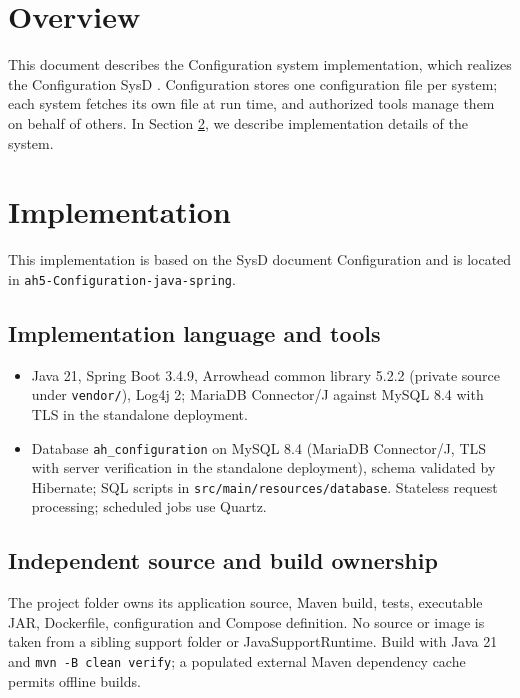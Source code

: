 \documentclass[a4paper]{arrowhead}
\begin{document}
\section{Overview}
\label{sec:overview}

This document describes the Configuration system implementation, which realizes the Configuration SysD \cite{cfg-sysd}. Configuration stores one configuration file per system; each system fetches its own file at run time, and authorized tools manage them on behalf of others.
In Section \ref{Implementation}, we describe implementation details of the system.

\newpage

\section{Implementation}
\label{Implementation}

This implementation is based on the SysD document Configuration \cite{cfg-sysd} and is located in \texttt{ah5-Configuration-java-spring}.

\subsection{Implementation language and tools}
\begin{itemize}
\item Java 21, Spring Boot 3.4.9, Arrowhead common library 5.2.2 (private source under \texttt{vendor/}), Log4j 2; MariaDB Connector/J against MySQL 8.4 with TLS in the standalone deployment.
\item Database \texttt{ah\_\allowbreak{}configuration} on MySQL 8.4 (MariaDB Connector/J, TLS with server verification in the standalone deployment), schema validated by Hibernate; SQL scripts in \texttt{src/\allowbreak{}main/\allowbreak{}resources/\allowbreak{}database}. Stateless request processing; scheduled jobs use Quartz.
\end{itemize}

\subsection{Independent source and build ownership}
The project folder owns its application source, Maven build, tests, executable JAR, Dockerfile, configuration and Compose definition. No source or image is taken from a sibling support folder or JavaSupportRuntime. Build with Java 21 and \texttt{mvn -B clean verify}; a populated external Maven dependency cache permits offline builds.
\end{document}
